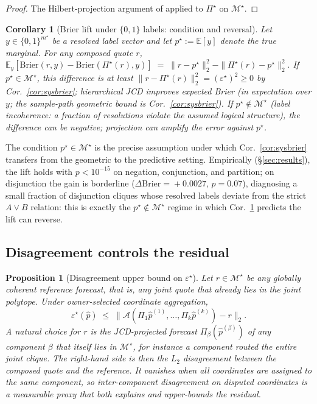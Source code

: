 \documentclass{article}
\theoremstyle{plain}
\newtheorem{proposition}[theorem]{Proposition}
\newtheorem{corollary}[theorem]{Corollary}
\theoremstyle{definition}
\theoremstyle{remark}
\newcommand{\Mjoint}{\mathcal{M}^{\star}}
\newcommand{\Pijoint}{\Pi^{\star}}
\newcommand{\Aagg}{\mathcal{A}}
\newcommand{\hpK}{\hat p}
\newcommand{\E}{\mathbb{E}}
\newcommand{\eps}{\varepsilon}
\begin{document}
\begin{proof}
The Hilbert-projection argument of  applied to
$\Pijoint$ on $\Mjoint$.
\end{proof}

\begin{corollary}[Brier lift under $\{0,1\}$ labels: condition and reversal]
\label{cor:label_lift}
Let $y\!\in\!\{0,1\}^{m^\star}$ be a resolved label vector and let
$p^\star := \E[y]$ denote the true marginal.
For any composed quote $r$,
\(
\E_y[\mathrm{Brier}(r,y) - \mathrm{Brier}(\Pijoint(r),y)] \;=\;
\|r-p^\star\|_2^2 - \|\Pijoint(r)-p^\star\|_2^2.
\)
If $p^\star \in \Mjoint$, this difference is at least
$\|r-\Pijoint(r)\|_2^2 = (\eps^\star)^2 \ge 0$ by Cor.~\ref{cor:sysbrier};
hierarchical JCD improves expected Brier (in expectation over $y$;
the sample-path geometric bound is Cor.~\ref{cor:sysbrier}).
If $p^\star \notin \Mjoint$ (label incoherence: a fraction of resolutions
violate the assumed logical structure), the difference can be negative;
projection can amplify the error against $p^\star$.
\end{corollary}

\noindent The condition $p^\star \in \Mjoint$ is the precise assumption
under which Cor.~\ref{cor:sysbrier} transfers from the geometric to the
predictive setting. Empirically (\S\ref{sec:results}), the lift holds with
$p\!<\!10^{-15}$ on negation, conjunction, and partition; on
disjunction the gain is borderline ($\Delta\mathrm{Brier}\!=\!{+}0.0027$, $p\!=\!0.07$),
diagnosing a small fraction of disjunction cliques whose resolved
labels deviate from the strict $A\!\vee\!B$ relation: this is
exactly the $p^\star\!\notin\!\Mjoint$ regime in which
Cor.~\ref{cor:label_lift} predicts the lift can reverse.

\subsection{Disagreement controls the residual}
\label{subsec:disagree}

\begin{proposition}[Disagreement upper bound on $\eps^\star$]
\label{prop:disagree}
Let $r \in \Mjoint$ be any \emph{globally coherent reference
forecast}, that is, any joint quote that already lies in the
joint polytope. Under owner-selected coordinate aggregation,
\[
\eps^\star(\hpK)
\;\le\;
\bigl\|\Aagg(\Pi_1\hpK^{(1)},\dots,\Pi_k\hpK^{(k)}) - r\bigr\|_2.
\]
A natural choice for $r$ is the JCD-projected forecast
$\Pi_\beta(\hpK^{(\beta)})$ of any component $\beta$ that itself
lies in $\Mjoint$, for instance a component routed the entire
joint clique. The right-hand side is then the $L_2$ disagreement
between the composed quote and the reference. It vanishes when
all coordinates are assigned to the same component, so
inter-component disagreement on disputed coordinates is a
measurable proxy that both explains and upper-bounds the
residual.
\end{proposition}
\end{document}
